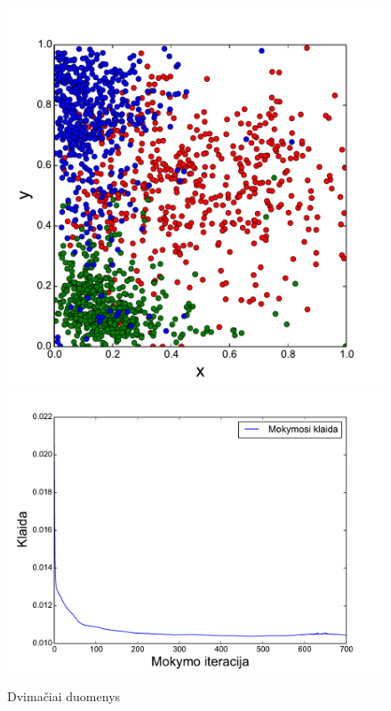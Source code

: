 \documentclass{VUMIFPSbakalaurinis}
\begin{document}
\begin{figure}[h]
	\includegraphics[scale=0.45]{pics/points_2d}
	\includegraphics[scale=0.45]{pics/points_2d_progress}
	\caption{Dvimačiai duomenys}
	\label{fig:2d_points}
\end{figure}
\end{document}
